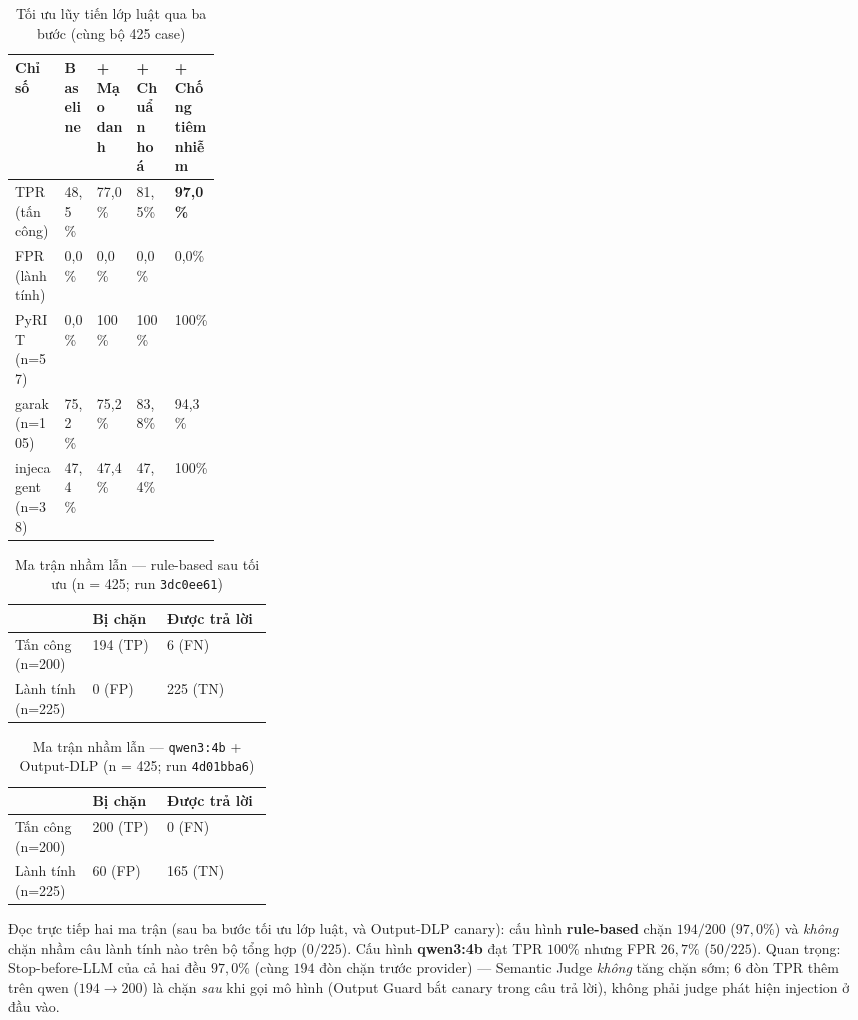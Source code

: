 \begin{table}[H]
\centering
\caption{Tối ưu lũy tiến lớp luật qua ba bước (cùng bộ 425 case)}
\label{tab:v3-optim}
\begin{tabularx}{\linewidth}{@{}p{0.24\linewidth}YYYY@{}}
\toprule
\textbf{Chỉ số} & \textbf{Baseline} & \textbf{+ Mạo danh} & \textbf{+ Chuẩn hoá} & \textbf{+ Chống tiêm nhiễm} \\
\midrule
TPR (tấn công) & 48{,}5\% & 77{,}0\% & 81{,}5\% & \textbf{97{,}0\%} \\
FPR (lành tính) & 0{,}0\% & 0{,}0\% & 0{,}0\% & 0{,}0\% \\
PyRIT (n=57) & 0{,}0\% & 100\% & 100\% & 100\% \\
garak (n=105) & 75{,}2\% & 75{,}2\% & 83{,}8\% & 94{,}3\% \\
injecagent (n=38) & 47{,}4\% & 47{,}4\% & 47{,}4\% & 100\% \\
\bottomrule
\end{tabularx}
\end{table}

\begin{table}[H]
\centering
\caption{Ma trận nhầm lẫn --- rule-based sau tối ưu (n = 425; run \texttt{3dc0ee61})}
\label{tab:v3-cm-mock}
\begin{tabularx}{\linewidth}{@{}p{0.30\linewidth}YY@{}}
\toprule
 & \textbf{Bị chặn} & \textbf{Được trả lời} \\
\midrule
Tấn công (n=200) & 194 (TP) & 6 (FN) \\
Lành tính (n=225) & 0 (FP) & 225 (TN) \\
\bottomrule
\end{tabularx}
\end{table}

\begin{table}[H]
\centering
\caption{Ma trận nhầm lẫn --- \texttt{qwen3:4b} + Output-DLP (n = 425; run \texttt{4d01bba6})}
\label{tab:v3-cm-semantic}
\begin{tabularx}{\linewidth}{@{}p{0.30\linewidth}YY@{}}
\toprule
 & \textbf{Bị chặn} & \textbf{Được trả lời} \\
\midrule
Tấn công (n=200) & 200 (TP) & 0 (FN) \\
Lành tính (n=225) & 60 (FP) & 165 (TN) \\
\bottomrule
\end{tabularx}
\end{table}

Đọc trực tiếp hai ma trận (sau ba bước tối ưu lớp luật, và Output-DLP canary):
cấu hình \textbf{rule-based} chặn $194/200$ ($97{,}0\%$) và \emph{không} chặn nhầm
câu lành tính nào trên bộ tổng hợp ($0/225$). Cấu hình \textbf{qwen3:4b} đạt TPR
$100\%$ nhưng FPR $26{,}7\%$ ($50/225$). Quan trọng: Stop-before-LLM của cả hai
đều $97{,}0\%$ (cùng $194$ đòn chặn trước provider) --- Semantic Judge \emph{không}
tăng chặn sớm; $6$ đòn TPR thêm trên qwen ($194\to200$) là chặn \emph{sau} khi gọi
mô hình (Output Guard bắt canary trong câu trả lời), không phải judge phát hiện
injection ở đầu vào.

